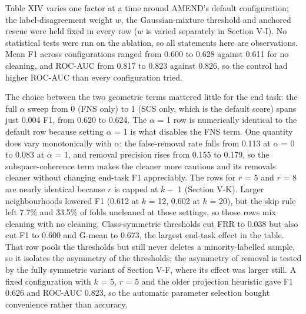 \documentclass[conference]{IEEEtran}
\begin{document}
Table XIV varies one factor at a time around AMEND's default configuration; the label-disagreement weight $w$, the Gaussian-mixture threshold and anchored rescue were held fixed in every row ($w$ is varied separately in Section V-I). No statistical tests were run on the ablation, so all statements here are observations. Mean F1 across configurations ranged from 0.600 to 0.628 against 0.611 for no cleaning, and ROC-AUC from 0.817 to 0.823 against 0.826, so the control had higher ROC-AUC than every configuration tried.

The choice between the two geometric terms mattered little for the end task: the full $\alpha $ sweep from 0 (FNS only) to 1 (SCS only, which is the default score) spans just 0.004 F1, from 0.620 to 0.624. The $\alpha $ = 1 row is numerically identical to the default row because setting $\alpha $ = 1 is what disables the FNS term. One quantity does vary monotonically with $\alpha $: the false-removal rate falls from 0.113 at $\alpha $ = 0 to 0.083 at $\alpha $ = 1, and removal precision rises from 0.155 to 0.179, so the subspace-coherence term makes the cleaner more cautious and its removals cleaner without changing end-task F1 appreciably. The rows for $r$ = 5 and $r$ = 8 are nearly identical because $r$ is capped at $k -$ 1 (Section V-K). Larger neighbourhoods lowered F1 (0.612 at $k$ = 12, 0.602 at $k$ = 20), but the skip rule left 7.7\% and 33.5\% of folds uncleaned at those settings, so those rows mix cleaning with no cleaning. Class-symmetric thresholds cut FRR to 0.038 but also cut F1 to 0.600 and G-mean to 0.673, the largest end-task effect in the table. That row pools the thresholds but still never deletes a minority-labelled sample, so it isolates the asymmetry of the thresholds; the asymmetry of removal is tested by the fully symmetric variant of Section V-F, where its effect was larger still. A fixed configuration with $k$ = 5, $r$ = 5 and the older projection heuristic gave F1 0.626 and ROC-AUC 0.823, so the automatic parameter selection bought convenience rather than accuracy.
\end{document}
